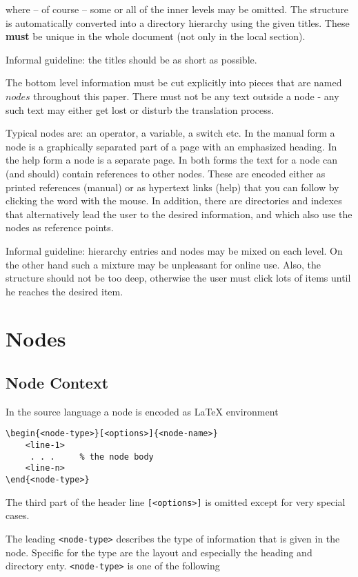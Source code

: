 where -- of course -- some or all of the inner levels may be omitted. The
structure is automatically converted into a directory hierarchy using the
given titles. These {\bf must} be unique in the whole document (not only in
the local section).

Informal guideline: the titles should be as short as possible.

The bottom level information must be cut explicitly into pieces that are
named $nodes$ throughout this paper. There must not be any text outside a
node - any such text may either get lost or disturb the translation process.

Typical nodes are: an operator, a variable, a switch etc. In the manual form
a node is a graphically separated part of a page with an emphasized heading.
In the help form a node is a separate page. In both forms the text for a
node can (and should) contain references to other nodes. These are encoded
either as printed references (manual) or as hypertext links (help) that you
can follow by clicking the word with the mouse. In addition, there are
directories and indexes that alternatively lead the user to the desired
information, and which also use the nodes as reference points.

Informal guideline: hierarchy entries and nodes may be mixed on each level.
On the other hand such a mixture may be unpleasant for online use. Also, the
structure should not be too deep, otherwise the user must click lots of
items until he reaches the desired item.

\section{Nodes}

\subsection{Node Context}

In the source language a node is encoded as \LaTeX{} environment
\begin{verbatim}
\begin{<node-type>}[<options>]{<node-name>}
    <line-1>
     . . .     % the node body
    <line-n>
\end{<node-type>}
\end{verbatim}

The third part of the header line \verb|[<options>]| is omitted except for
very special cases.

The leading \verb|<node-type>| describes the type of information that is
given in the node. Specific for the type are the layout and especially the
heading and directory enty. \verb|<node-type>| is one of the following

